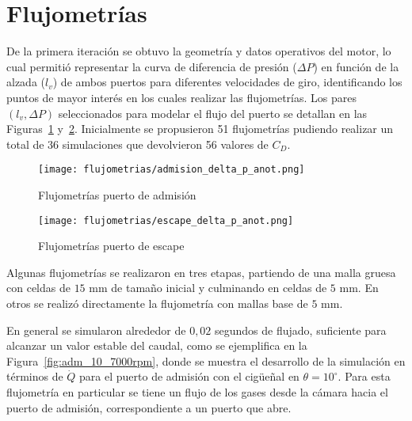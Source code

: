 
\section{Flujometrías}

De la primera iteración se obtuvo la geometría y datos operativos del motor, lo
cual permitió representar la curva de diferencia de presión ($\Delta P$) en
función de la alzada ($l_{v}$) de ambos puertos para diferentes velocidades de
giro, identificando los puntos de mayor interés en los cuales realizar las
flujometrías.
%
Los pares $(l_{v}, \Delta P)$ seleccionados para modelar el flujo del puerto se
detallan en las Figuras~\ref{fig:delta_p_admision} y~\ref{fig:delta_p_escape}.
%
Inicialmente se propusieron 51 flujometrías pudiendo realizar un total de 36
simulaciones que devolvieron 56 valores de $C_{D}$.

\begin{figure}[h!]
  \centering
  \texttt{[image: flujometrias/admision\_delta\_p\_anot.png]}
  \caption{Flujometrías puerto de admisión}\label{fig:delta_p_admision}
\end{figure}

\begin{figure}[h!]
  \centering
  \texttt{[image: flujometrias/escape\_delta\_p\_anot.png]}
  \caption{Flujometrías puerto de escape}\label{fig:delta_p_escape}
\end{figure}


Algunas flujometrías se realizaron en tres etapas, partiendo de una malla gruesa
con celdas de $15$ mm de tamaño inicial y culminando en celdas de $5$ mm.
%
En otros se realizó directamente la flujometría con mallas base de $5$ mm.

En general se simularon alrededor de $0,02$ segundos de flujado, suficiente para
alcanzar un valor estable del caudal, como se ejemplifica en la
Figura~\ref{fig:adm_10_7000rpm}, donde se muestra el desarrollo de la simulación
en términos de $\dot{Q}$ para el puerto de admisión con el cigüeñal en
$\theta=10^{\circ}$.
%
Para esta flujometría en particular se tiene un flujo de los gases desde la
cámara hacia el puerto de admisión, correspondiente a un puerto que abre.

%
%

